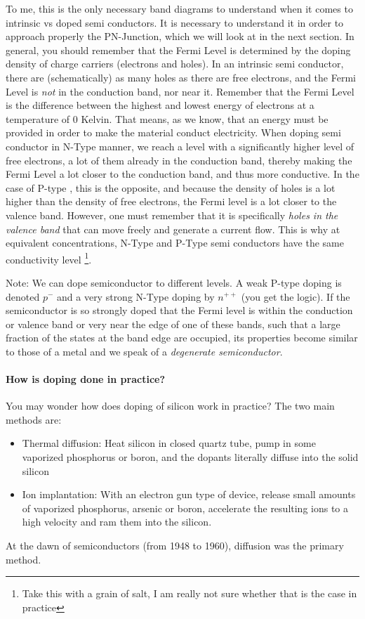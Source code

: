 To me, this is the only necessary band diagrams to understand when it comes to intrinsic vs doped semi conductors. It is necessary to understand it in order to approach properly the PN-Junction, which we will look at in the next section. In general, you should remember that the Fermi Level is determined by the doping density of charge carriers (electrons and holes). In an intrinsic semi conductor, there are (schematically) as many holes as there are free electrons, and the Fermi Level is \textit{not} in the conduction band, nor near it. Remember that the Fermi Level is the difference between the highest and lowest energy of electrons at a temperature of 0 Kelvin. That means, as we know, that an energy must be provided in order to make the material conduct electricity. When doping semi conductor in N-Type manner, we reach a level with a significantly higher level of free electrons, a lot of them already in the conduction band, thereby making the Fermi Level a lot closer to the conduction band, and thus more conductive. In the case of P-type , this is the opposite, and because the density of holes is a lot higher than the density of free electrons, the Fermi level is a lot closer to the valence band. However, one must remember that it is specifically \textit{holes in the valence band} that can move freely and generate a current flow. This is why at equivalent concentrations, N-Type and P-Type semi conductors have the same conductivity level \footnote{Take this with a grain of salt, I am really not sure whether that is the case in practice}.

Note: We can dope semiconductor to different levels. A weak P-type doping is denoted $p^-$ and a very strong N-Type doping by $n^{++}$ (you get the logic). If the semiconductor is so strongly doped that the Fermi level is within the conduction or valence band or very near the edge of one of these bands, such that a large fraction of the states at the band edge are occupied, its properties become similar to those of a metal and we speak of a
\textit{degenerate semiconductor}.

\paragraph{How is doping done in practice?}
You may wonder how does doping of silicon work in practice? The two main methods are:
\begin{itemize}
    \item Thermal diffusion: Heat silicon in closed quartz tube, pump in some vaporized phosphorus or boron, and the dopants literally diffuse into the solid silicon
    \item Ion implantation: With an electron gun type of device, release small amounts of vaporized phosphorus, arsenic or boron, accelerate the resulting ions to a high velocity and ram them into the silicon.  
\end{itemize}
At the dawn of semiconductors (from 1948 to 1960), diffusion was the primary method.
